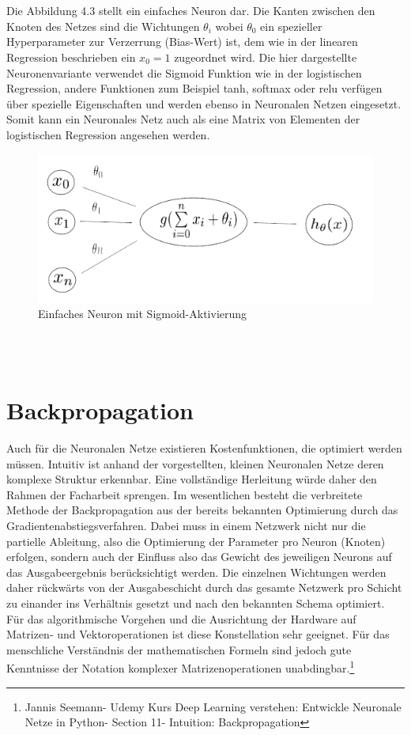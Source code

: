 \documentclass[a4paper]{scrreprt}
\begin{document}
\\\\
Die Abbildung 4.3 stellt ein einfaches Neuron dar. Die Kanten zwischen den Knoten des Netzes sind die Wichtungen $\theta_{i}$ wobei $\theta_{0}$ ein spezieller Hyperparameter zur Verzerrung (Bias-Wert) ist, dem wie in der linearen Regression beschrieben ein $x_0=1$ zugeordnet wird. Die hier dargestellte Neuronenvariante verwendet die Sigmoid Funktion wie in der logistischen Regression, andere Funktionen zum Beispiel tanh, softmax oder relu verfügen über spezielle Eigenschaften und werden ebenso in Neuronalen Netzen eingesetzt. Somit kann ein Neuronales Netz auch als eine Matrix von Elementen der logistischen Regression angesehen werden.\\
%
\begin{figure}[h]
\centering
\includegraphics[scale=.64]{Abbildungen/Neuronale_Netze_2}
\caption{Einfaches Neuron mit Sigmoid-Aktivierung}
\label{figure}
\end{figure}
\\\\  
\section{Backpropagation}
Auch für die Neuronalen Netze existieren Kostenfunktionen, die optimiert werden müssen. Intuitiv ist anhand der vorgestellten, kleinen Neuronalen Netze deren komplexe Struktur erkennbar. Eine vollständige Herleitung würde daher den Rahmen der Facharbeit sprengen. Im wesentlichen besteht die verbreitete Methode der Backpropagation aus der bereits bekannten Optimierung durch das Gradientenabstiegsverfahren. Dabei muss in einem Netzwerk nicht nur die partielle Ableitung, also die Optimierung der Parameter pro Neuron (Knoten) erfolgen, sondern auch der Einfluss also das Gewicht des jeweiligen Neurons auf das Ausgabeergebnis berücksichtigt werden. Die einzelnen Wichtungen werden daher rückwärts von der Ausgabeschicht durch das gesamte Netzwerk pro Schicht zu einander ins Verhältnis gesetzt und nach den bekannten Schema optimiert. Für das algorithmische Vorgehen und die Ausrichtung der Hardware auf Matrizen- und Vektoroperationen ist diese Konstellation sehr geeignet. Für das menschliche Verständnis der mathematischen Formeln sind jedoch gute Kenntnisse der Notation komplexer Matrizenoperationen unabdingbar.\footnote{Jannis Seemann- Udemy Kurs Deep Learning verstehen: Entwickle Neuronale Netze in Python- Section 11- Intuition: Backpropagation}
\newpage
\end{document}

